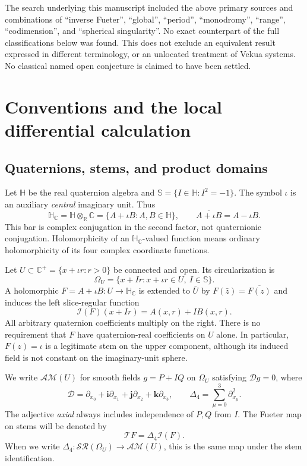 \documentclass[11pt,a4paper]{article}
\numberwithin{equation}{section}
\theoremstyle{definition}
\theoremstyle{remark}
\newcommand{\R}{\mathbb R}
\newcommand{\C}{\mathbb C}
\newcommand{\HH}{\mathbb H}
\newcommand{\HC}{\mathbb H_{\C}}
\newcommand{\Sph}{\mathbb S}
\newcommand{\AM}{\mathcal{AM}}
\newcommand{\SR}{\mathcal{SR}}
\newcommand{\T}{\mathcal T}
\newcommand{\D}{\mathcal D}
\newcommand{\Lap}{\Delta_4}
\newcommand{\ind}{\mathcal I}
\begin{document}
The search underlying this manuscript included the above primary sources
and combinations of ``inverse Fueter'', ``global'', ``period'',
``monodromy'', ``range'', ``codimension'', and ``spherical singularity''.
No exact counterpart of the full classifications below was found.
This does not exclude an equivalent result expressed in different
terminology, or an unlocated treatment of Vekua systems. No classical
named open conjecture is claimed to have been settled.

\section{Conventions and the local differential calculation}
\label{sec:background}

\subsection{Quaternions, stems, and product domains}
Let $\HH$ be the real quaternion algebra and
$\Sph=\{I\in\HH:I^2=-1\}$. The symbol $\iota$ is an auxiliary
\emph{central} imaginary unit. Thus
\[
 \HC=\HH\otimes_{\R}\C=\{A+\iota B:A,B\in\HH\},
 \qquad \overline{A+\iota B}=A-\iota B.
\]
This bar is complex conjugation in the second factor, not quaternionic
conjugation. Holomorphicity of an $\HC$-valued function means ordinary
holomorphicity of its four complex coordinate functions.

Let $U\subset\C^+=\{x+\iota r:r>0\}$ be connected and open. Its
circularization is
\[
 \Omega_U=\{x+Ir:x+\iota r\in U,\ I\in\Sph\}.
\]
A holomorphic $F=A+\iota B:U\to\HC$ is extended to $\bar U$ by
$F(\bar z)=\overline{F(z)}$ and induces the left slice-regular function
\[
 \ind(F)(x+Ir)=A(x,r)+IB(x,r).
\]
All arbitrary quaternion coefficients multiply on the right. There is no
requirement that $F$ have quaternion-real coefficients on $U$ alone.
In particular, $F(z)=\iota$ is a legitimate stem on the upper component,
although its induced field is not constant on the imaginary-unit sphere.

We write $\AM(U)$ for smooth fields $g=P+IQ$ on $\Omega_U$ satisfying
$\D g=0$, where
\[
 \D=\partial_{x_0}+\mathbf i\partial_{x_1}
             +\mathbf j\partial_{x_2}+\mathbf k\partial_{x_3},
 \qquad \Lap=\sum_{\mu=0}^3\partial_{x_\mu}^2.
\]
The adjective \emph{axial} always includes independence of $P,Q$ from $I$.
The Fueter map on stems will be denoted by
\[
 \T F=\Lap\ind(F).
\]
When we write $\Lap:\SR(\Omega_U)\to\AM(U)$, this is the same map under
the stem identification.
\end{document}
